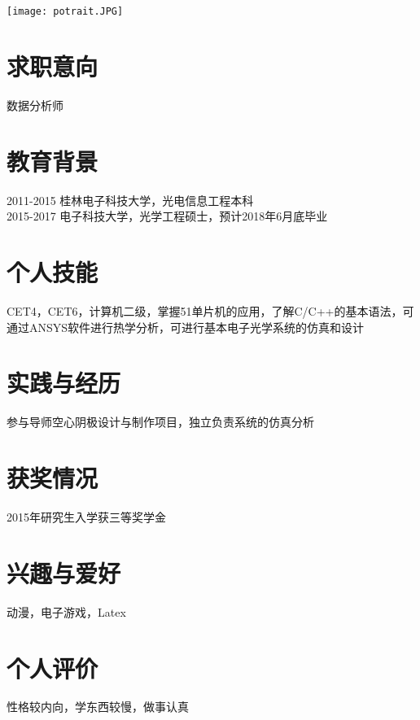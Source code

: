 \documentclass[12pt]{article}
\begin{document}
\newlength{\mycode}
\newlength{\mycodet}
\settowidth{\mycode}{Mail:bxg620@icloud.com}
\settowidth{\mycodet}{individual CV}


\noindent 
\begin{minipage}[b]{\mycodet}
\\[2ex]
\end{minipage}
\hfill
\begin{minipage}[b]{\mycode}
\\
\end{minipage}
\hfil
\begin{minipage}[b]{2.5cm}
\texttt{[image: potrait.JPG]}
\end{minipage}

\vspace{1.5cm}

\section{求职意向}
数据分析师

\section{教育背景}
2011-2015 桂林电子科技大学，光电信息工程本科\\
2015-2017 电子科技大学，光学工程硕士，预计2018年6月底毕业

\section{个人技能}
CET4，CET6，计算机二级，掌握51单片机的应用，了解C/C++的基本语法，可通过ANSYS软件进行热学分析，可进行基本电子光学系统的仿真和设计 

\section{实践与经历}
参与导师空心阴极设计与制作项目，独立负责系统的仿真分析

\section{获奖情况}
2015年研究生入学获三等奖学金

\section{兴趣与爱好}
动漫，电子游戏，Latex

\section{个人评价}
性格较内向，学东西较慢，做事认真
\end{document}
